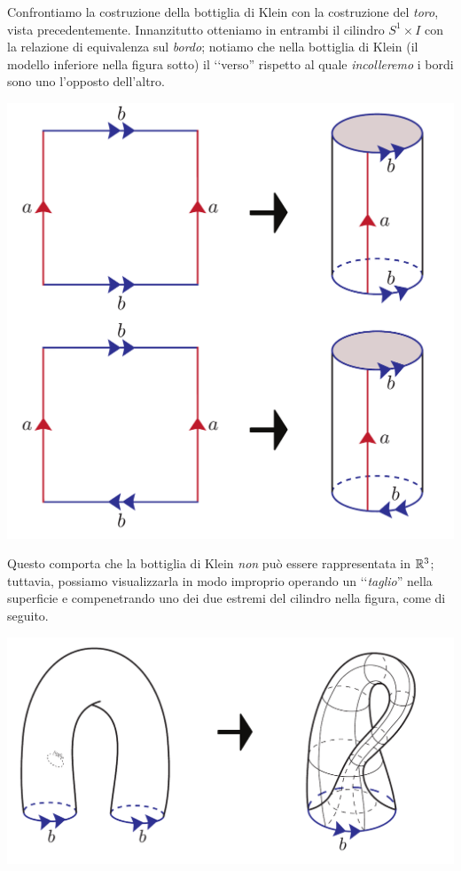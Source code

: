 \begin{examples}
\begin{itemize}
\begin{center}
		\end{center}
		Confrontiamo la costruzione della bottiglia di Klein con la costruzione del \textit{toro}, vista precedentemente. Innanzitutto otteniamo in entrambi il cilindro $S^1\times I$ con la relazione di equivalenza sul \textit{bordo}; notiamo che nella bottiglia di Klein (il modello inferiore nella figura sotto) il ‘‘verso'' rispetto al quale \textit{incolleremo} i bordi sono uno l'opposto dell'altro.
		\begin{center}
			\includegraphics[trim=0cm 0cm 0cm 0cm, clip, scale=0.375]{images/kleintorus.pdf}
		\end{center}
	Questo comporta che la bottiglia di Klein \textit{non} può essere rappresentata in $\mathbb{R}^3$; tuttavia, possiamo visualizzarla in modo improprio operando un ‘‘\textit{taglio}'' nella superficie e compenetrando uno dei due estremi del cilindro nella figura, come di seguito.
	 \begin{center}
	 	\includegraphics[trim=0cm 0cm 0cm 0cm, clip, scale=0.375]{images/kleinconstruction.pdf}
	 \end{center}
	\end{itemize}
\vspace{-6mm}
\end{examples}

